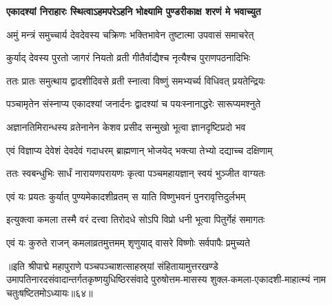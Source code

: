 \twolineshloka
{\textbf{एकादश्यां निराहारः स्थित्वाऽहमपरेऽहनि}}
{\textbf{भोक्ष्यामि पुण्डरीकाक्ष शरणं मे भवाच्युत}}%

\twolineshloka
{अमुं मन्त्रं समुच्चार्य देवदेवस्य चक्रिणः}
{भक्तिभावेन तुष्टात्मा उपवासं समाचरेत्}%

\twolineshloka
{कुर्याद् देवस्य पुरतो जागरं नियतो व्रती}
{गीतैर्वाद्यैश्च नृत्यैश्च पुराणपठनादिभिः}%

\twolineshloka
{ततः प्रातः समुत्थाय द्वादशीदिवसे व्रती}
{स्नात्वा विष्णुं समभ्यर्च्य विधिवत् प्रयतेन्द्रियः}%

\twolineshloka
{पञ्चामृतेन संस्नाप्य एकादश्यां जनार्दनः}
{द्वादश्यां च पयःस्नानाद्धरेः सारूप्यमश्नुते}%

\twolineshloka
{अज्ञानतिमिरान्धस्य व्रतेनानेन केशव}
{प्रसीद सन्मुखो भूत्वा ज्ञानदृष्टिप्रदो भव}%

\twolineshloka
{एवं विज्ञाप्य देवेशं देवदेवं गदाधरम्}
{ब्राह्मणान् भोजयेद् भक्त्या तेभ्यो दद्याच्च दक्षिणाम्}%

\twolineshloka
{ततः स्वबन्धुभिः सार्धं नारायणपरायणः}
{कृत्वा पञ्चमहायज्ञान् स्वयं भुञ्जीत वाग्यतः}%

\twolineshloka
{एवं यः प्रयतः कुर्यात् पुण्यमेकादशीव्रतम्}
{स याति विष्णुभवनं पुनरावृत्तिदुर्लभम्}%

\twolineshloka
{इत्युक्त्वा कमला तस्मै वरं दत्त्वा तिरोदधे}
{सोऽपि विप्रो धनी भूत्वा पितुर्गेहं समागतः}%


\twolineshloka
{एवं यः कुरुते राजन् कमलाव्रतमुत्तमम्}
{शृणुयाद् वासरे विष्णोः सर्वपापैः प्रमुच्यते}%

॥इति श्रीपाद्मे महापुराणे पञ्चपञ्चाशत्साहस्र्यां संहितायामुत्तरखण्डे उमापतिनारदसंवादान्तर्गतकृष्णयुधिष्ठिरसंवादे पुरुषोत्तम-मासस्य शुक्ल-कमला-एकादशी-माहात्म्यं नाम चतुःषष्टितमोऽध्यायः॥६४॥

\genMangalaShloka

\hyperref[sec:ekadashi_mahatmyam_padma_puranam]{\closesub}
\clearpage

